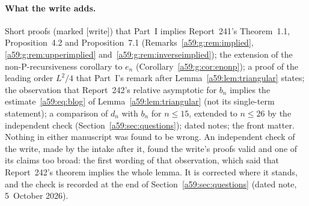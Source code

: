 \documentclass[11pt,letterpaper]{article}
\theoremstyle{remark}\newtheorem{remark}[theorem]{Remark}
\newcommand{\wtag}{\textup{[write]}}
\theoremstyle{remark}\newtheorem{wremark}{Remark}\renewcommand{\thewremark}{W\arabic{wremark}}
\theoremstyle{plain}\newtheorem{wcorollary}[wremark]{Corollary}
\begin{document}
\paragraph{What the write adds.} Short proofs (marked \wtag) that Part~I
implies Report~241's Theorem~1.1, Proposition~4.2 and Proposition~7.1
(Remarks~\ref{a59:g:rem:implied}, \ref{a59:g:rem:upperimplied}
and~\ref{a59:g:rem:inverseimplied}); the extension of the
non-P-recursiveness corollary to $e_n$ (Corollary~\ref{a59:g:cor:enonp});
a proof of the leading order $L^2/4$ that Part~I's remark after
Lemma~\ref{a59:lem:triangular} states; the observation that Report~242's
relative asymptotic for $b_n$ implies the estimate~\eqref{a59:eq:blog} of
Lemma~\ref{a59:lem:triangular} (not its single-term statement); a
comparison of $d_n$ with $b_n$ for $n\le15$, extended to $n\le26$ by the
independent check (Section~\ref{a59:sec:questions});
dated notes; the front matter. Nothing in either manuscript was found to be
wrong. An independent check of the write, made by the intake after it,
found the write's proofs valid and one of its claims too broad: the first
wording of that observation, which said that Report~242's theorem implies
the whole lemma. It is corrected where it stands, and the check is recorded
at the end of Section~\ref{a59:sec:questions} (dated note, 5~October 2026).
\end{document}
